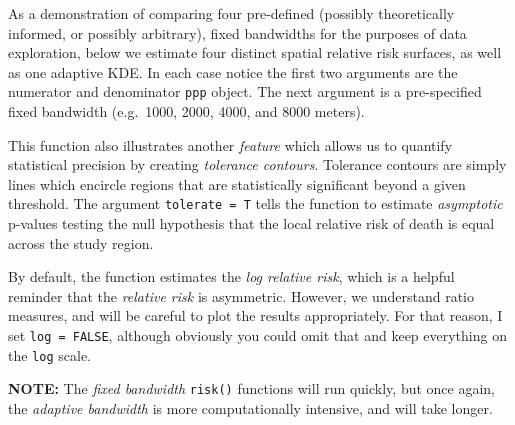 \documentclass[
]{book}
\begin{document}
As a demonstration of comparing four pre-defined (possibly theoretically informed, or possibly arbitrary), fixed bandwidths for the purposes of data exploration, below we estimate four distinct spatial relative risk surfaces, as well as one adaptive KDE. In each case notice the first two arguments are the numerator and denominator \texttt{ppp} object. The next argument is a pre-specified fixed bandwidth (e.g.~1000, 2000, 4000, and 8000 meters).

This function also illustrates another \emph{feature} which allows us to quantify statistical precision by creating \emph{tolerance contours}. Tolerance contours are simply lines which encircle regions that are statistically significant beyond a given threshold. The argument \texttt{tolerate\ =\ T} tells the function to estimate \emph{asymptotic} p-values testing the null hypothesis that the local relative risk of death is equal across the study region.

By default, the function estimates the \emph{log relative risk}, which is a helpful reminder that the \emph{relative risk} is asymmetric. However, we understand ratio measures, and will be careful to plot the results appropriately. For that reason, I set \texttt{log\ =\ FALSE}, although obviously you could omit that and keep everything on the \texttt{log} scale.

\textbf{NOTE:} The \emph{fixed bandwidth} \texttt{risk()} functions will run quickly, but once again, the \emph{adaptive bandwidth} is more computationally intensive, and will take longer.
\end{document}
